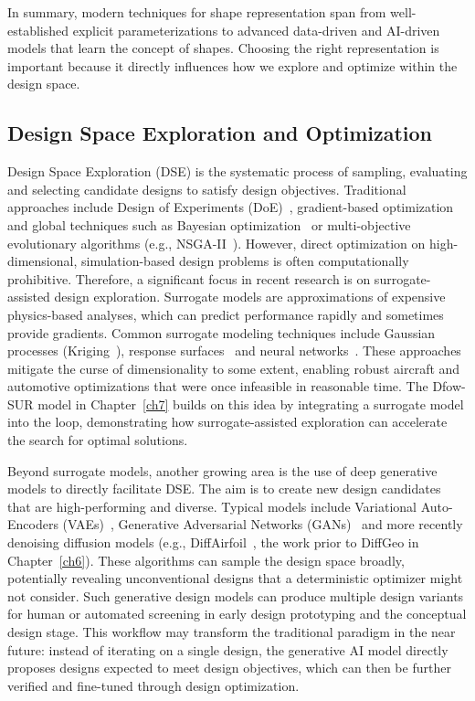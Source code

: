 In summary, modern techniques for shape representation span from well-established explicit parameterizations to advanced data-driven and AI-driven models that learn the concept of shapes. Choosing the right representation is important because it directly influences how we explore and optimize within the design space.

\subsection{Design Space Exploration and Optimization}
Design Space Exploration (DSE) is the systematic process of sampling, evaluating and selecting candidate designs to satisfy design objectives. Traditional approaches include Design of Experiments (DoE)~\cite{aa.Fisher1935}, gradient-based optimization and global techniques such as Bayesian optimization~\cite{aa.Kushner1964} or multi-objective evolutionary algorithms (e.g., NSGA-II~\cite{aa.Deb2002}). However, direct optimization on high-dimensional, simulation-based design problems is often computationally prohibitive. Therefore, a significant focus in recent research is on surrogate-assisted design exploration. Surrogate models are approximations of expensive physics-based analyses, which can predict performance rapidly and sometimes provide gradients. Common surrogate modeling techniques include Gaussian processes (Kriging~\cite{aa.Matheron1963}), response surfaces~\cite{aa.Box1951} and neural networks~\cite{ai.Rumelhart1986}. These approaches mitigate the curse of dimensionality to some extent, enabling robust aircraft and automotive optimizations that were once infeasible in reasonable time. The Dfow-SUR model in Chapter~\ref{ch7} builds on this idea by integrating a surrogate model into the loop, demonstrating how surrogate-assisted exploration can accelerate the search for optimal solutions.

Beyond surrogate models, another growing area is the use of deep generative models to directly facilitate DSE. The aim is to create new design candidates that are high-performing and diverse. Typical models include Variational Auto-Encoders (VAEs)~\cite{aa.Yonekura2021,aa.Kou2023,aa.Swannet2024,aa.Wang2022}, Generative Adversarial Networks (GANs)~\cite{aa.Li2020,aa.Li2021,aa.Achour2020,aa.Chen2020} and more recently denoising diffusion models (e.g., DiffAirfoil~\cite{aa.Wei2024}, the work prior to DiffGeo in Chapter~\ref{ch6}). These algorithms can sample the design space broadly, potentially revealing unconventional designs that a deterministic optimizer might not consider. Such generative design models can produce multiple design variants for human or automated screening in early design prototyping and the conceptual design stage. This workflow may transform the traditional paradigm in the near future: instead of iterating on a single design, the generative AI model directly proposes designs expected to meet design objectives, which can then be further verified and fine-tuned through design optimization.

